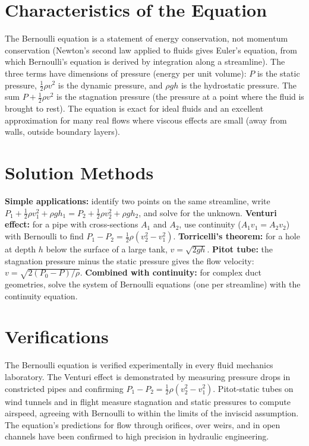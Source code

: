 \section*{Characteristics of the Equation}

The Bernoulli equation is a statement of energy conservation, not momentum conservation (Newton's second law applied to fluids gives Euler's equation, from which Bernoulli's equation is derived by integration along a streamline). The three terms have dimensions of pressure (energy per unit volume): $P$ is the static pressure, $\frac{1}{2}\rho v^2$ is the dynamic pressure, and $\rho gh$ is the hydrostatic pressure. The sum $P + \frac{1}{2}\rho v^2$ is the stagnation pressure (the pressure at a point where the fluid is brought to rest). The equation is exact for ideal fluids and an excellent approximation for many real flows where viscous effects are small (away from walls, outside boundary layers).
\section*{Solution Methods}

\textbf{Simple applications:} identify two points on the same streamline, write $P_1 + \frac{1}{2}\rho v_1^2 + \rho gh_1 = P_2 + \frac{1}{2}\rho v_2^2 + \rho gh_2$, and solve for the unknown. \textbf{Venturi effect:} for a pipe with cross-sections $A_1$ and $A_2$, use continuity ($A_1 v_1 = A_2 v_2$) with Bernoulli to find $P_1 - P_2 = \frac{1}{2}\rho(v_2^2 - v_1^2)$. \textbf{Torricelli's theorem:} for a hole at depth $h$ below the surface of a large tank, $v = \sqrt{2gh}$. \textbf{Pitot tube:} the stagnation pressure minus the static pressure gives the flow velocity: $v = \sqrt{2(P_0 - P)/\rho}$. \textbf{Combined with continuity:} for complex duct geometries, solve the system of Bernoulli equations (one per streamline) with the continuity equation.
\section*{Verifications}

The Bernoulli equation is verified experimentally in every fluid mechanics laboratory. The Venturi effect is demonstrated by measuring pressure drops in constricted pipes and confirming $P_1 - P_2 = \frac{1}{2}\rho(v_2^2 - v_1^2)$. Pitot-static tubes on wind tunnels and in flight measure stagnation and static pressures to compute airspeed, agreeing with Bernoulli to within the limits of the inviscid assumption. The equation's predictions for flow through orifices, over weirs, and in open channels have been confirmed to high precision in hydraulic engineering.
